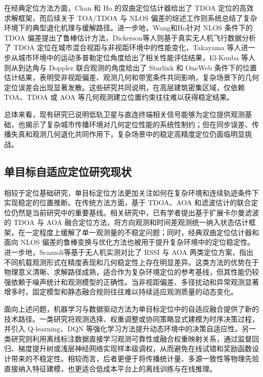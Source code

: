 在经典定位方法方面，Chan 和 Ho 的双曲定位估计器给出了 TDOA 定位的高效求解框架，而后续关于 TOA/TDOA 与 NLOS 偏差的综述工作则系统总结了复杂环境下的典型退化机理与缓解路径\cite{Chan1994Hyperbolic,Guvenc2009TOASurvey}。进一步地，Wang和Ho针对 NLOS 条件下的 TDOA 偏差提出了鲁棒估计方法，Dickerson等人则基于真实无人机飞行数据分析了 TDOA 定位在城市混合视距与非视距环境中的性能变化，Takayama 等人进一步从城市环境中的运动多普勒定位角度给出了相关性能评估结果，El-Kouba 等人则从到达角与 Doppler 联合观测的角度给出了 Starlink 和 OneWeb 条件下的位置估计结果，表明受非视距偏差、观测几何和带宽条件共同影响，复杂场景下的几何定位误差会出现显著发散\cite{Wang2013TDOANLOS,Dickerson2025TDOA,Takayama2024KinematicDopplerUrban,ElKouba2025DOADopplerLEO,deSousa2018NLOSRayTracing}。这些研究共同说明，在高层建筑密集区域，仅依赖 TOA、TDOA 或 AOA 等几何观测建立位置约束往往难以获得稳定结果。

总体来看，现有研究已说明低轨卫星与直连终端相关信号能够为定位提供观测基础，也揭示了复杂城市传播环境对几何定位性能的系统性制约；但在同步误差、传播失真和观测几何退化共同作用下，复杂场景中的稳定高精度定位仍面临明显挑战。

\subsection{单目标自适应定位研究现状}
\label{subsec:1_2_2}

相较于定位基础研究，单目标定位方法更加关注如何在复杂环境和连续轨迹条件下实现稳定的位置推断。在传统方法方面，基于 TDOA、AOA 和滤波估计的联合定位仍然是当前研究中的重要基线。相关研究中，已有学者提出基于扩展卡尔曼滤波的 TDOA 与 AOA 融合定位方法\cite{EKFTDOAAOA2025}，将方向观测和时间差观测统一纳入状态估计框架，在一定程度上缓解了单一观测量的不稳定问题；同时，经典双曲定位估计器和面向 NLOS 偏差的鲁棒变换与优化方法也被用于提升复杂环境中的定位稳定性\cite{Chan1994Hyperbolic,Wang2013TDOANLOS}。进一步地，Scazzoli等基于无人机实测对比了 RSSI 与 AOA 两类定位方案，指出不同机载观测形式在精度表现和几何稳定性上存在明显差异\cite{Scazzoli2024RSSIAoA}。这类方法的优势在于物理意义清晰、求解路径成熟，适合作为复杂环境定位的参考基线，但其性能仍较强依赖于噪声统计和观测模型的正确性。当非视距偏差、多径扰动和异常观测显著增多时，固定模型和静态融合规则往往难以持续适应观测质量的动态变化。

面向上述问题，机器学习与数据驱动方法为单目标定位中的自适应融合提供了新的技术路径。一类研究将观测选择、权重调整或协同策略显式建模为时序决策过程，并引入 Q-learning、DQN 等强化学习方法提升动态环境中的决策自适应性\cite{Mnih2015DQN,Peng2019DRLLocalization,Wu2019QLearningLocalization,Shurrab2023UAVRL}。另一类研究则利用离线标注数据直接学习观测可靠性或融合权重映射关系，通过监督回归、梯度提升树或浅层神经网络实现样本级调权，从而避免在线试错和奖励函数设计带来的不稳定性。相较而言，后者更便于将传播统计量、多源一致性等物理先验直接纳入特征建模，也更适合低成本平台上的离线训练与在线推理。


